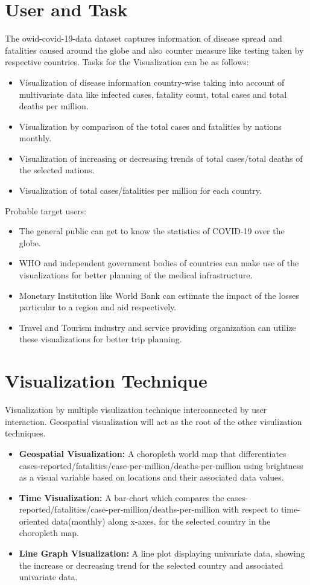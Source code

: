 \documentclass[10pt]{article}
\begin{document}
\section{User and Task}
The owid-covid-19-data dataset captures information of disease spread and fatalities caused around the globe and also counter measure like testing taken by respective countries.\newline
Tasks for the Visualization can be as follows:
\begin{itemize}
    \item Visualization of disease information country-wise taking into account of multivariate data like infected cases, fatality count, total cases and total deaths per million.
    \item Visualization by comparison of the total cases and fatalities by nations monthly.
    \item Visualization of increasing or decreasing trends of total cases/total deaths of the selected nations.
    \item Visualization of total cases/fatalities per million for each country.
\end{itemize}
Probable target users:
\begin{itemize}
    \item The general public can get to know the statistics of COVID-19 over the globe. 
    \item WHO and independent government bodies of countries can make use of the visualizations for better planning of the medical infrastructure. 
    \item Monetary Institution like World Bank can estimate the impact of the losses particular to a region and aid respectively.
    \item Travel and Tourism industry and service providing organization can utilize these visualizations for better trip planning.
\end{itemize}


\section{Visualization Technique}
Visualization by multiple visulization technique interconnected by user interaction. Geospatial visualization will act as the root of the other visulization techniques. 
\begin{itemize}
    \item \textbf{Geospatial Visualization:} A choropleth world map that differentiates cases-reported/fatalities/case-per-million/deaths-per-million using brightness as a visual variable based on locations and their associated data values.
    \item \textbf{Time Visualization:} A bar-chart which compares the cases-reported/fatalities/case-per-million/deaths-per-million with respect to time-oriented data(monthly) along x-axes, for the selected country in the choropleth map. 
     \item \textbf{Line Graph Visualization:} A line plot displaying univariate data, showing the increase or decreasing trend for the selected country and associated univariate data.
\end{itemize}
\end{document}
